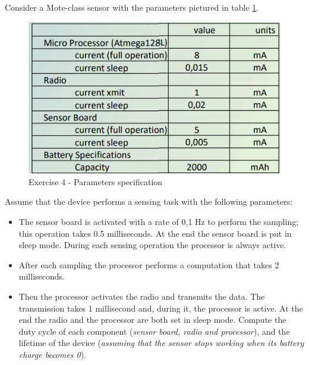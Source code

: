 Consider a Mote-class sensor with the parameters pictured in table \ref{chenergy-ex4}.
\begin{figure}
	\centering\includegraphics[scale=0.50]{images/Pasted image 20230328174646.png}
	\caption{Exercise 4 - Parameters specification}
	\label{chenergy-ex4}
\end{figure}


Assume that the device performs a sensing task with the following parameters:
\begin{itemize}
	\item 
	The sensor board is activated with a rate of 0,1 Hz to perform the sampling; this operation takes 0.5 milliseconds. At the end the sensor board is put in sleep mode. During each sensing operation the processor is always active.
	\item 
	After each sampling the processor performs a computation that takes 2 milliseconds.
	\item 
	Then the processor activates the radio and transmits the data. The transmission takes 1 millisecond and, during it, the processor is active. At the end the radio and the processor are both set in sleep mode.
	Compute the duty cycle of each component (\textit{sensor board, radio and processor}), and the lifetime of the device (\textit{assuming that the sensor stops working when its battery charge becomes 0}).
\end{itemize}
